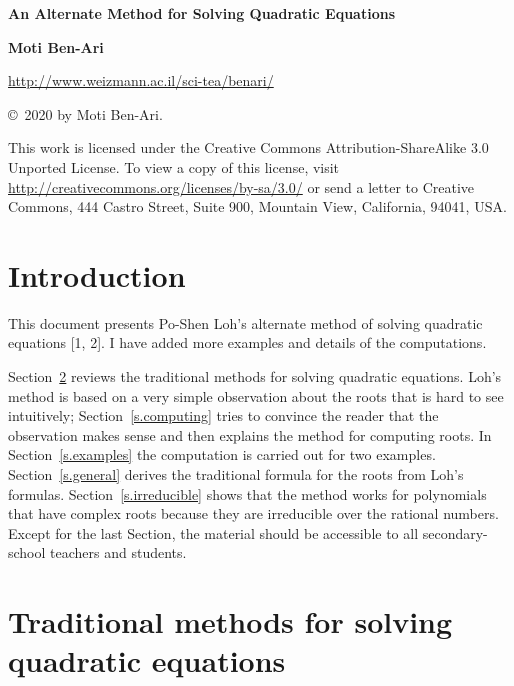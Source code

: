 \documentclass[12pt,a4paper]{article}
\begin{document}
\thispagestyle{empty}

\begin{center}
\textbf{\large An Alternate Method for Solving Quadratic Equations}

\bigskip

\textbf{\large Moti Ben-Ari}

\bigskip

\bigskip

\url{http://www.weizmann.ac.il/sci-tea/benari/}
\end{center}

\begin{footnotesize}
\begin{center}
\copyright{}\ 2020 by Moti Ben-Ari.
\end{center}

This work is licensed under the Creative Commons Attribution-ShareAlike 3.0 Unported License. To view a copy of this license, visit \url{http://creativecommons.org/licenses/by-sa/3.0/} or send a letter to Creative Commons, 444 Castro Street, Suite 900, Mountain View, California, 94041, USA.
\end{footnotesize}

\section{Introduction}

This document presents Po-Shen Loh's alternate method of solving quadratic equations [1, 2]. I have added more examples and details of the computations.

Section~\ref{s.traditional} reviews the traditional methods for solving quadratic equations. Loh's method is based on a very simple observation about the roots that is hard to see intuitively; Section~\ref{s.computing} tries to convince the reader that the observation makes sense and then explains the method for computing roots. In Section~\ref{s.examples} the computation is carried out for two examples. Section~\ref{s.general} derives the traditional formula for the roots from Loh's formulas. Section~\ref{s.irreducible} shows that the method works for polynomials that have complex roots because they are irreducible over the rational numbers. Except for the last Section, the material should be accessible to all secondary-school teachers and students.

\section{Traditional methods for solving quadratic equations}\label{s.traditional}
\end{document}
